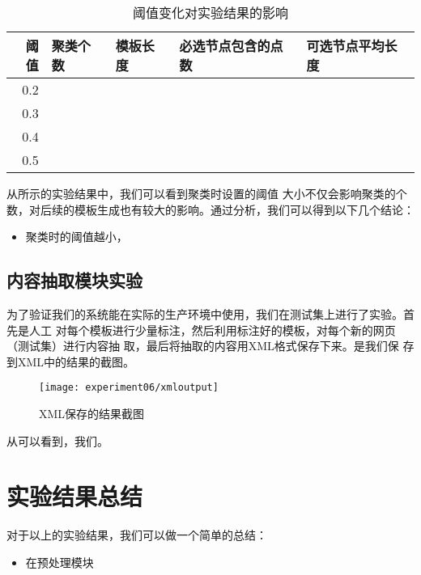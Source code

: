 \begin{table}
  \centering
\begin{tabular}{rllll}
  \toprule
阈值 & 聚类个数 & 模板长度 & 必选节点包含的点数 & 可选节点平均长度 \\
\hline
0.2 &  &  &  &  \\
0.3 &  &  &  &  \\
0.4 &  &  &  &  \\
0.5 &  &  &  &  \\
\bottomrule
\end{tabular}
\caption{阈值变化对实验结果的影响\label{experiment:tab:threshold}}
\end{table}
\begin{comment}
#+ORGTBL: SEND 阈值变化 orgtbl-to-latex :splice nil :skip 0
| 阈值 | 聚类个数 | 模板长度 | 必选节点包含的点数 | 可选节点平均长度 |
|------+----------+----------+--------------------+------------------|
|  0.2 |          |          |                    |                  |
|  0.3 |          |          |                    |                  |
|  0.4 |          |          |                    |                  |
|  0.5 |          |          |                    |                  |
\end{comment}


从所示的实验结果中，我们可以看到聚类时设置的阈值
大小不仅会影响聚类的个数，对后续的模板生成也有较大的影响。通过分析，我们可以得到以下几个结论：%
\begin{itemize}
\item 聚类时的阈值越小，
\end{itemize}

\subsection{内容抽取模块实验}
为了验证我们的系统能在实际的生产环境中使用，我们在测试集上进行了实验。首先是人工
对每个模板进行少量标注，然后利用标注好的模板，对每个新的网页（测试集）进行内容抽
取，最后将抽取的内容用XML格式保存下来。是我们保
存到XML中的结果的截图。
\begin{figure}[hb]
  \centering
  \texttt{[image: experiment06/xmloutput]}
  \caption{XML保存的结果截图}
  \label{experiment:fig:xmloutput}
\end{figure}

从可以看到，我们。%
\section{实验结果总结}
\label{sec:analysis}
对于以上的实验结果，我们可以做一个简单的总结：%
\begin{itemize}
\item 在预处理模块
\end{itemize}

